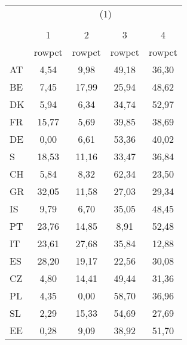 {
\def\sym#1{\ifmmode^{#1}\else\(^{#1}\)\fi}
\begin{tabular}{l*{4}{c}}
\hline\hline
            &\multicolumn{4}{c}{(1)}                            \\
            &\multicolumn{4}{c}{}                               \\
            &           1&           2&           3&           4\\
            &      rowpct&      rowpct&      rowpct&      rowpct\\
\hline
AT          &        4,54&        9,98&       49,18&       36,30\\
BE          &        7,45&       17,99&       25,94&       48,62\\
DK          &        5,94&        6,34&       34,74&       52,97\\
FR          &       15,77&        5,69&       39,85&       38,69\\
DE          &        0,00&        6,61&       53,36&       40,02\\
S           &       18,53&       11,16&       33,47&       36,84\\
CH          &        5,84&        8,32&       62,34&       23,50\\
GR          &       32,05&       11,58&       27,03&       29,34\\
IS          &        9,79&        6,70&       35,05&       48,45\\
PT          &       23,76&       14,85&        8,91&       52,48\\
IT          &       23,61&       27,68&       35,84&       12,88\\
ES          &       28,20&       19,17&       22,56&       30,08\\
CZ          &        4,80&       14,41&       49,44&       31,36\\
PL          &        4,35&        0,00&       58,70&       36,96\\
SL          &        2,29&       15,33&       54,69&       27,69\\
EE          &        0,28&        9,09&       38,92&       51,70\\
\hline\hline
\end{tabular}
}
